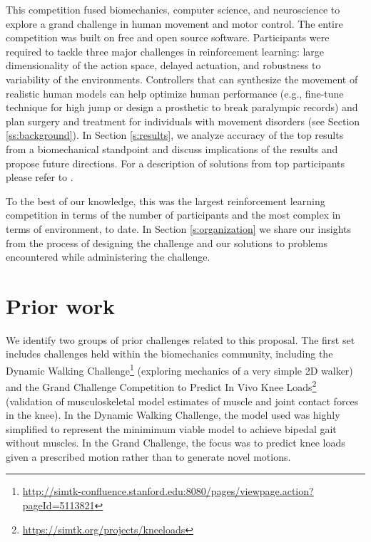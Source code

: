 \documentclass[graybox]{svmult}
\begin{document}
This competition fused biomechanics, computer science, and neuroscience to explore a grand challenge in human movement and motor control. The entire competition was built on free and open source software. Participants were required to tackle three major challenges in reinforcement learning: large dimensionality of the action space, delayed actuation, and robustness to variability of the environments. Controllers that can synthesize the movement of realistic human models can help optimize human performance (e.g., fine-tune technique for high jump or design a prosthetic to break paralympic records) and plan surgery and treatment for individuals with movement disorders (see Section \ref{ss:background}). In Section \ref{s:results}, we analyze accuracy of the top results from a biomechanical standpoint and discuss implications of the results and propose future directions. For a description of solutions from top participants please refer to \cite{jaskowski2018rltorunfast,kidzinski2018l2rsolutions}.

To the best of our knowledge, this was the largest reinforcement learning competition in terms of the number of participants and the most complex in terms of environment, to date. In Section \ref{s:organization} we share our insights from the process of designing the challenge and our solutions to problems encountered while administering the challenge.


\section{Prior work}

We identify two groups of prior challenges related to this proposal. The first set includes challenges held within the biomechanics community, including the Dynamic Walking Challenge\footnote{\url{http://simtk-confluence.stanford.edu:8080/pages/viewpage.action?pageId=5113821}} (exploring mechanics of a very simple 2D walker) and the Grand Challenge Competition to Predict In Vivo Knee Loads\footnote{\url{https://simtk.org/projects/kneeloads}} (validation of musculoskeletal model estimates of muscle and joint contact forces in the knee). In the Dynamic Walking Challenge, the model used was highly simplified to represent the minimimum viable model to achieve bipedal gait without muscles. In the Grand Challenge, the focus was to predict knee loads given a prescribed motion rather than to generate novel motions.
\end{document}
